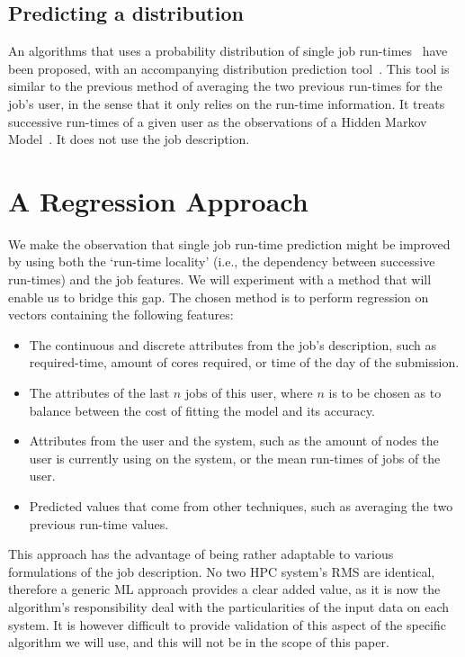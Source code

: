 \documentclass{article}
\begin{document}

\subsection{Predicting a distribution}
\label{sub:predicting_a_distribution}

An algorithms that uses a probability distribution of single job run-times~\cite{probabilistic-backfilling} have been proposed, with an accompanying distribution prediction tool~\cite{hmm}. This tool is similar to the previous method of averaging the two previous run-times for the job's user, in the sense that it only relies on the run-time information. It treats successive run-times of a given user as the observations of a Hidden Markov Model~\cite{rabiner}. It does not use the job description.

\section{A Regression Approach}
\label{sec:our_approach}
We make the observation that single job run-time prediction might be improved by using both the `run-time locality' (i.e., the dependency between successive run-times) and the job features. We will experiment with a method that will enable us to bridge this gap.
The chosen method is to perform regression on vectors containing the following features:
\begin{itemize}
  \item The continuous and discrete attributes from the job's description, such as required-time, amount of cores required, or time of the day of the submission.
  \item The attributes of the last $n$ jobs of this user, where $n$ is to be chosen as to balance between the cost of fitting the model and its accuracy.
  \item Attributes from the user and the system, such as the amount of nodes the user is currently using on the system, or the mean run-times of jobs of the user.
  \item Predicted values that come from other techniques, such as averaging the two previous run-time values.
\end{itemize}
This approach has the advantage of being rather adaptable to various formulations of the job description.
No two HPC system's RMS are identical, therefore a generic ML approach provides a clear added value, as it is now the algorithm's responsibility deal with the particularities of the input data on each system.
It is however difficult to provide validation of this aspect of the specific algorithm we will use, and this will not be in the scope of this paper.
\end{document}
